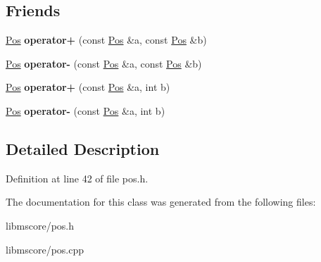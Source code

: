 \subsection*{Friends}
\begin{DoxyCompactItemize}
\item 
\mbox{\label{class_ms_1_1_pos_a56185475cf6a8d2480204d0eb048e912}} 
\hyperlink{class_ms_1_1_pos}{Pos} {\bfseries operator+} (const \hyperlink{class_ms_1_1_pos}{Pos} \&a, const \hyperlink{class_ms_1_1_pos}{Pos} \&b)
\item 
\mbox{\label{class_ms_1_1_pos_a4bcb43bff0377fdf11fdebfb93491373}} 
\hyperlink{class_ms_1_1_pos}{Pos} {\bfseries operator-\/} (const \hyperlink{class_ms_1_1_pos}{Pos} \&a, const \hyperlink{class_ms_1_1_pos}{Pos} \&b)
\item 
\mbox{\label{class_ms_1_1_pos_a31496a32a11c70976cb90a50de4183d7}} 
\hyperlink{class_ms_1_1_pos}{Pos} {\bfseries operator+} (const \hyperlink{class_ms_1_1_pos}{Pos} \&a, int b)
\item 
\mbox{\label{class_ms_1_1_pos_ac949f25664b324bcf86eef0765c459fc}} 
\hyperlink{class_ms_1_1_pos}{Pos} {\bfseries operator-\/} (const \hyperlink{class_ms_1_1_pos}{Pos} \&a, int b)
\end{DoxyCompactItemize}


\subsection{Detailed Description}


Definition at line 42 of file pos.\+h.



The documentation for this class was generated from the following files\+:\begin{DoxyCompactItemize}
\item 
libmscore/pos.\+h\item 
libmscore/pos.\+cpp\end{DoxyCompactItemize}
